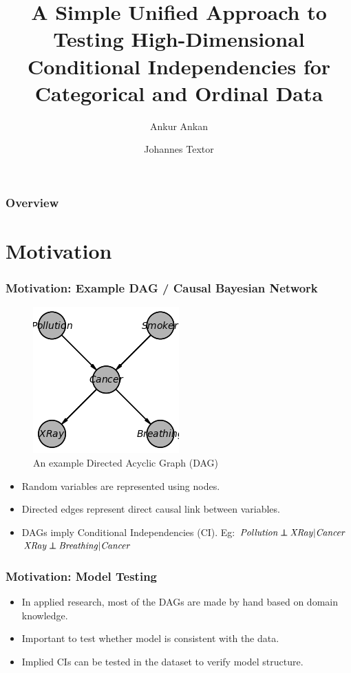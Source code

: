 \documentclass{beamer}
\def\ci{\perp\!\!\!\!\!\perp}
\begin{document}
\title{A Simple Unified Approach to Testing High-Dimensional Conditional
Independencies for Categorical and Ordinal Data}
\author {Ankur Ankan \and Johannes Textor}
\date{}
\maketitle

\begin{frame}
	\frametitle{Overview}
	\tableofcontents
\end{frame}

\section{Motivation}
\begin{frame}
	\frametitle{Motivation: Example DAG / Causal Bayesian Network}
	\begin{figure}
		\centering
		\includegraphics[scale=0.6]{imgs/example_dag.png}
		\caption*{An example Directed Acyclic Graph (DAG)}
	\end{figure}
	\begin{itemize}
		\setlength\itemsep{1em}
		\item Random variables are represented using nodes.
		\item Directed edges represent direct causal link between variables.
		\item DAGs imply Conditional Independencies (CI). Eg:
			\hspace*{20pt} $ \text{\emph{Pollution}} \ci \text{\emph{XRay}} | \text{\emph{Cancer}} $ \newline
			\hspace*{20pt} $ \text{\emph{XRay}} \ci \text{\emph{Breathing}} | \text{\emph{Cancer}} $
	\end{itemize}
\end{frame}

\begin{frame}
	\frametitle{Motivation: Model Testing}
	\begin{itemize}
		\setlength\itemsep{1em}
		\item In applied research, most of the DAGs are made by hand
			based on domain knowledge.
		\item Important to test whether model is consistent with the data.
		\item Implied CIs can be tested in the dataset to verify
			model structure.
	\end{itemize}

\end{frame}
\end{document}
